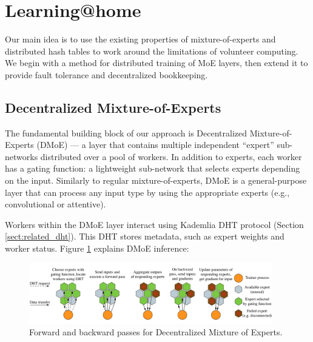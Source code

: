 \vspace{-4px}
\section{Learning@home}\label{sect:method}
\vspace{-2px}

Our main idea is to use the existing properties of mixture-of-experts and distributed hash tables to work around the limitations of volunteer computing. We begin with a method for distributed training of MoE layers, then extend it to provide fault tolerance and decentralized bookkeeping.

\vspace{-2px}
\subsection{Decentralized Mixture-of-Experts}\label{sect:method_dmoe}
\vspace{-2px}

The fundamental building block of our approach is Decentralized Mixture-of-Experts (DMoE) --- a layer that contains multiple independent ``expert'' sub-networks distributed over a pool of workers. In addition to experts, each worker has a gating function: a lightweight sub-network that selects experts depending on the input. Similarly to regular mixture-of-experts, DMoE is a general-purpose layer that can process any input type by using the appropriate experts (e.g., convolutional or attentive).

Workers within the DMoE layer interact using Kademlia DHT protocol (Section \ref{sect:related_dht}). This DHT stores metadata, such as expert weights and worker status. Figure \ref{fig:dmoe_inference} explains DMoE inference:

\begin{figure}[h]
\vspace{-10px}
    \centering
    \includegraphics[width=400px,height=100px]{resources/schematic-training-v2.pdf}
    \caption{Forward and backward passes for Decentralized Mixture of Experts.}
    \label{fig:dmoe_inference}
\end{figure}

\vspace{-4px}


